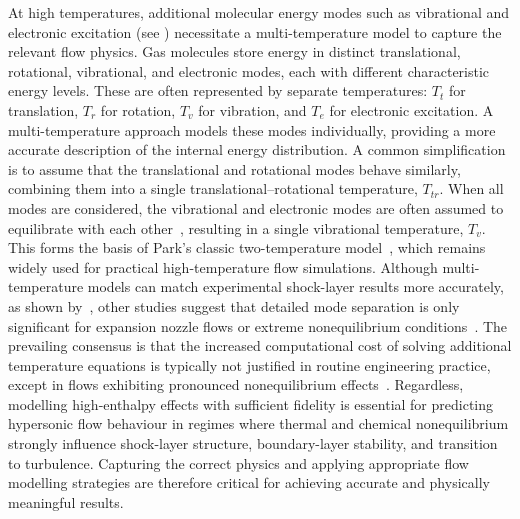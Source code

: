 At high temperatures, additional molecular energy modes such as vibrational and electronic excitation (see ) necessitate a multi-temperature model to capture the relevant flow physics. Gas molecules store energy in distinct translational, rotational, vibrational, and electronic modes, each with different characteristic energy levels. These are often represented by separate temperatures: $T_t$ for translation, $T_r$ for rotation, $T_v$ for vibration, and $T_e$ for electronic excitation. A multi-temperature approach models these modes individually, providing a more accurate description of the internal energy distribution. A common simplification is to assume that the translational and rotational modes behave similarly, combining them into a single translational--rotational temperature, $T_{tr}$. When all modes are considered, the vibrational and electronic modes are often assumed to equilibrate with each other~\citep{Bertin2006}, resulting in a single vibrational temperature, $T_v$. This forms the basis of Park's classic two-temperature model~\citep{Park1990}, which remains widely used for practical high-temperature flow simulations. Although multi-temperature models can match experimental shock-layer results more accurately, as shown by~\citet{Gulhan2018}, other studies suggest that detailed mode separation is only significant for expansion nozzle flows or extreme nonequilibrium conditions~\citep{ParkLee1995}. The prevailing consensus is that the increased computational cost of solving additional temperature equations is typically not justified in routine engineering practice, except in flows exhibiting pronounced nonequilibrium effects~\citep{Nagnibeda2009}. Regardless, modelling high-enthalpy effects with sufficient fidelity is essential for predicting hypersonic flow behaviour in regimes where thermal and chemical nonequilibrium strongly influence shock-layer structure, boundary-layer stability, and transition to turbulence. Capturing the correct physics and applying appropriate flow modelling strategies are therefore critical for achieving accurate and physically meaningful results.


